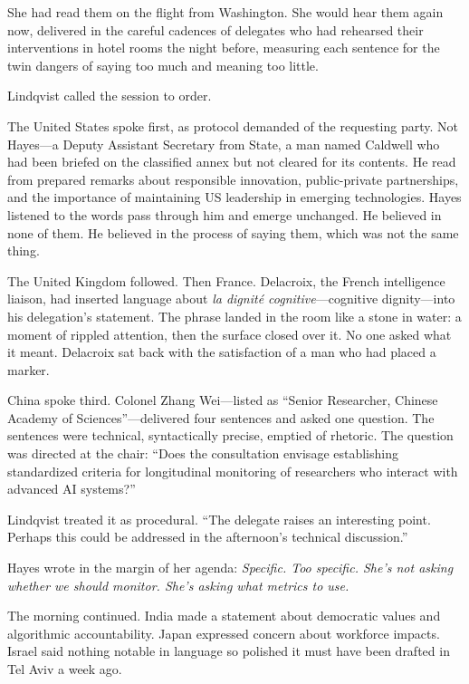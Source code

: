 She had read them on the flight from Washington. She would hear them again now, delivered in the careful cadences of delegates who had rehearsed their interventions in hotel rooms the night before, measuring each sentence for the twin dangers of saying too much and meaning too little.

Lindqvist called the session to order.

\scenebreak

The United States spoke first, as protocol demanded of the requesting party. Not Hayes---a Deputy Assistant Secretary from State, a man named Caldwell who had been briefed on the classified annex but not cleared for its contents. He read from prepared remarks about responsible innovation, public-private partnerships, and the importance of maintaining US leadership in emerging technologies. Hayes listened to the words pass through him and emerge unchanged. He believed in none of them. He believed in the process of saying them, which was not the same thing.

The United Kingdom followed. Then France. Delacroix, the French intelligence liaison, had inserted language about \textit{la dignit\'e cognitive}---cognitive dignity---into his delegation's statement. The phrase landed in the room like a stone in water: a moment of rippled attention, then the surface closed over it. No one asked what it meant. Delacroix sat back with the satisfaction of a man who had placed a marker.

China spoke third. Colonel Zhang Wei---listed as ``Senior Researcher, Chinese Academy of Sciences''---delivered four sentences and asked one question. The sentences were technical, syntactically precise, emptied of rhetoric. The question was directed at the chair: ``Does the consultation envisage establishing standardized criteria for longitudinal monitoring of researchers who interact with advanced AI systems?''

Lindqvist treated it as procedural. ``The delegate raises an interesting point. Perhaps this could be addressed in the afternoon's technical discussion.''

Hayes wrote in the margin of her agenda: \textit{Specific. Too specific. She's not asking whether we should monitor. She's asking what metrics to use.}

The morning continued. India made a statement about democratic values and algorithmic accountability. Japan expressed concern about workforce impacts. Israel said nothing notable in language so polished it must have been drafted in Tel Aviv a week ago.

